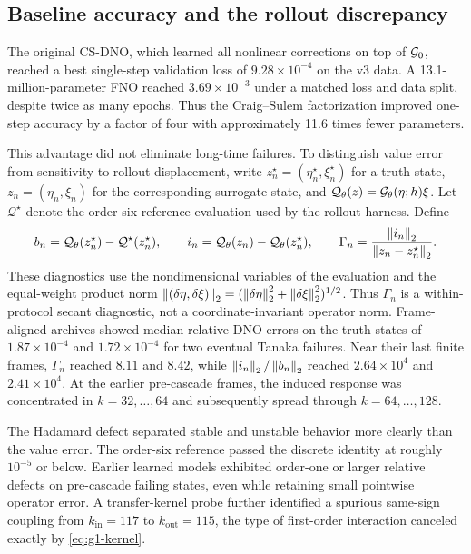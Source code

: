 \subsection{Baseline accuracy and the rollout discrepancy}

The original CS-DNO, which learned all nonlinear corrections on top of
$\mathcal{G}_0$, reached a best single-step validation loss of
$9.28\times10^{-4}$ on the v3 data. A 13.1-million-parameter FNO reached
$3.69\times10^{-3}$ under a matched loss and data split, despite twice as many
epochs. Thus the Craig--Sulem factorization improved one-step accuracy by a
factor of four with approximately 11.6 times fewer parameters.

This advantage did not eliminate long-time failures.  To distinguish value
error from sensitivity to rollout displacement, write
$z_n^\star=(\eta_n^\star,\xi_n^\star)$ for a truth state,
$z_n=(\eta_n,\xi_n)$ for the corresponding surrogate state, and
$\mathcal Q_\theta(z)=\mathcal{G}_{\theta}(\eta;h)\xi$.  Let
$\mathcal Q^\star$ denote the order-six reference evaluation used by the
rollout harness.  Define
\begin{equation}
  b_n=\mathcal Q_\theta(z_n^\star)-\mathcal Q^\star(z_n^\star),
  \qquad
  i_n=\mathcal Q_\theta(z_n)-\mathcal Q_\theta(z_n^\star),
  \qquad
  \Gamma_n=\frac{\left\lVert i_n\right\rVert_2}{\left\lVert z_n-z_n^\star\right\rVert_2}.
  \label{eq:rollout-secant-diagnostic}
\end{equation}
These diagnostics use the nondimensional variables of the evaluation and the
equal-weight product norm
$\left\lVert (\delta\eta,\delta\xi)\right\rVert_2
=(\left\lVert \delta\eta\right\rVert_2^2+\left\lVert \delta\xi\right\rVert_2^2)^{1/2}$.
Thus $\Gamma_n$ is a within-protocol secant diagnostic, not a
coordinate-invariant operator norm.
Frame-aligned archives showed median relative DNO errors on the truth states of
$1.87\times10^{-4}$ and $1.72\times10^{-4}$ for two eventual Tanaka failures.
Near their last finite frames, $\Gamma_n$ reached $8.11$ and $8.42$, while
$\left\lVert i_n\right\rVert_2/\left\lVert b_n\right\rVert_2$ reached $2.64\times10^4$ and
$2.41\times10^4$.  At the earlier pre-cascade frames, the induced response was
concentrated in $k=32,\ldots,64$ and subsequently spread through
$k=64,\ldots,128$.

The Hadamard defect separated stable and unstable behavior more clearly than
the value error. The order-six reference passed the discrete identity at
roughly $10^{-5}$ or below. Earlier learned models exhibited order-one or
larger relative defects on pre-cascade failing states, even while retaining
small pointwise operator error. A transfer-kernel probe further identified a
spurious same-sign coupling from $k_{\mathrm{in}}=117$ to
$k_{\mathrm{out}}=115$, the type of first-order interaction canceled exactly by
\eqref{eq:g1-kernel}.

